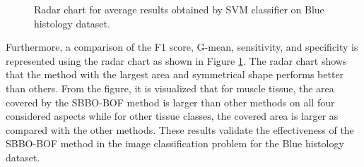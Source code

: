 \begin{figure}[h]
\centering
{}
 \caption[ Radar chart for average results obtained by SVM classifier on Blue histology dataset by considering F1 score, G-mean, sensitivity, and specificity]{\fontsize{10pt}{12pt}\selectfont Radar chart for average results obtained by SVM classifier on Blue histology dataset. }
\label{ch4:fig:T3tissue}
\end{figure}


Furthermore, a comparison of the F1 score, G-mean, sensitivity, and specificity is represented using the radar chart as shown in Figure \ref{ch4:fig:T3tissue}. The radar chart shows that the method with the largest area and symmetrical shape performs better than others. From the figure, it is visualized that for muscle tissue, the area covered by the SBBO-BOF method is larger than other methods on all four considered aspects while for other tissue classes, the covered area is larger as compared with the other methods. These results validate the effectiveness of the SBBO-BOF method in the image classification problem for the Blue histology dataset.


